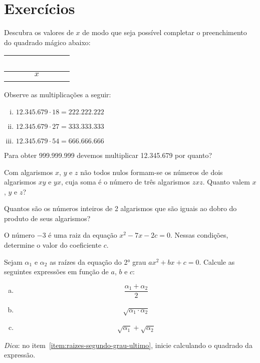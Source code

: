 \section{Exercícios}

\begin{exercise}
Descubra os valores de $x$ de modo que seja possível completar
o preenchimento do quadrado mágico abaixo:
\begin{center}
\begin{tabular}{|c|c|c|}
  \hline
   \ \ \  & \ \ \  & \ \ \  \\ \hline
          & $x$    &        \\ \hline
          &        &        \\
  \hline
\end{tabular}
\end{center}
\end{exercise}

\begin{exercise}
Observe as multiplicações a seguir:
\begin{enumerate}[i.]
  \item $12.345.679 \cdot 18 = 222.222.222$
  \item $12.345.679 \cdot 27 = 333.333.333$
  \item $12.345.679 \cdot 54 = 666.666.666$
\end{enumerate}
Para obter 999.999.999 devemos multiplicar 12.345.679 por quanto?
\end{exercise}

\begin{exercise}
Com algarismos $x$, $y$ e $z$ não todos nulos formam-se os
números de dois algarismos $xy$ e $yx$, cuja soma é o número de três
algarismos $zxz$. Quanto valem $x$, $y$ e $z$?
\end{exercise}

\begin{exercise}
Quantos são os números inteiros de 2 algarismos que são iguais
ao dobro do produto de seus algarismos?
\end{exercise}


\begin{exercise}
O número $-3$ é uma raiz da equação $x^2 -7x -2c = 0$. Nessas
condições, determine o valor do coeficiente $c$.
\end{exercise}

\begin{exercise}
  Sejam $\alpha_1$ e $\alpha_2$ as raízes da equação do 2° grau $ax^2+bx+c=0$. Calcule
  as seguintes expressões em função de $a$, $b$ e $c$:
  \begin{enumerate}[a)]
    \item \[\frac{\alpha_1+\alpha_2}{2}\]
    \item \[\sqrt{\alpha_1\cdot\alpha_2}\]
    \item \label{item:raizes-segundo-grau-ultimo} \[\sqrt{\alpha_1}+\sqrt{\alpha_2}\]
  \end{enumerate}
  \textit{Dica}: no item~\ref{item:raizes-segundo-grau-ultimo}, inicie calculando o 
  quadrado da expressão.
\end{exercise}

